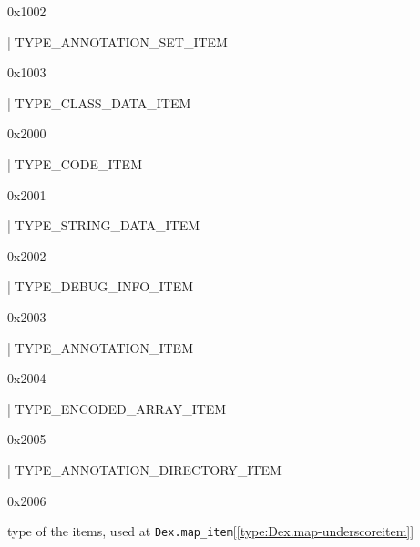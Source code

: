 \documentclass[11pt]{article}
\begin{document}
\begin{ocamldoccomment}
0x1002
\end{ocamldoccomment}
\begin{ocamldoccode}
  | TYPE_ANNOTATION_SET_ITEM
\end{ocamldoccode}
\begin{ocamldoccomment}
0x1003
\end{ocamldoccomment}
\begin{ocamldoccode}
  | TYPE_CLASS_DATA_ITEM
\end{ocamldoccode}
\begin{ocamldoccomment}
0x2000
\end{ocamldoccomment}
\begin{ocamldoccode}
  | TYPE_CODE_ITEM
\end{ocamldoccode}
\begin{ocamldoccomment}
0x2001
\end{ocamldoccomment}
\begin{ocamldoccode}
  | TYPE_STRING_DATA_ITEM
\end{ocamldoccode}
\begin{ocamldoccomment}
0x2002
\end{ocamldoccomment}
\begin{ocamldoccode}
  | TYPE_DEBUG_INFO_ITEM
\end{ocamldoccode}
\begin{ocamldoccomment}
0x2003
\end{ocamldoccomment}
\begin{ocamldoccode}
  | TYPE_ANNOTATION_ITEM
\end{ocamldoccode}
\begin{ocamldoccomment}
0x2004
\end{ocamldoccomment}
\begin{ocamldoccode}
  | TYPE_ENCODED_ARRAY_ITEM
\end{ocamldoccode}
\begin{ocamldoccomment}
0x2005
\end{ocamldoccomment}
\begin{ocamldoccode}
  | TYPE_ANNOTATION_DIRECTORY_ITEM
\end{ocamldoccode}
\begin{ocamldoccomment}
0x2006
\end{ocamldoccomment}
\begin{ocamldocdescription}
type of the items, used at {\tt{Dex.map\_item}}[\ref{type:Dex.map-underscoreitem}]


\end{ocamldocdescription}
\end{document}
